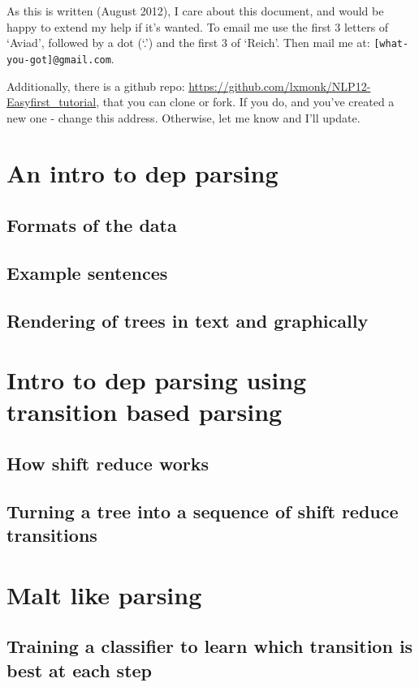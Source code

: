 \documentclass[11pt]{article}
\begin{document}
As this is written (August 2012), I care about this document, and
would be happy to extend my help if it's wanted. To email me use the
first 3 letters of `Aviad', followed by a dot (`.') and the
first 3 of `Reich'. Then mail me at: \texttt{[what-you-got]@gmail.com}.

Additionally, there is a github repo:
\href{https://github.com/lxmonk/NLP12-Easyfirst_tutorial}{https://github.com/lxmonk/NLP12-Easyfirst\_tutorial}, that you can clone
or fork. If you do, and you've created a new one - change this
address. Otherwise, let me know and I'll update.
\section{An intro to dep parsing}
\label{sec-2}
\subsection{Formats of the data}
\label{sec-2-1}
\subsection{Example sentences}
\label{sec-2-2}
\subsection{Rendering of trees in text and graphically}
\label{sec-2-3}
\section{Intro to dep parsing using transition based parsing}
\label{sec-3}
\subsection{How shift reduce works}
\label{sec-3-1}
\subsection{Turning a tree into a sequence of shift reduce transitions}
\label{sec-3-2}
\section{Malt like parsing}
\label{sec-4}
\subsection{Training a classifier to learn which transition is best at each step}
\label{sec-4-1}
\end{document}
